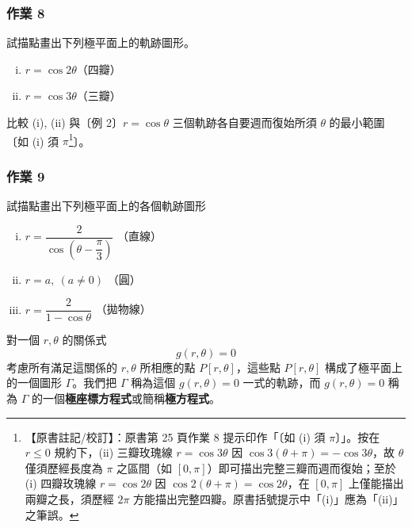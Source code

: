 \medskip
\subsubsection*{作業 8}
試描點畫出下列極平面上的軌跡圖形。
\begin{enumerate}[(i)]
  \item $r = \cos 2\theta$（四瓣）
  \item $r = \cos 3\theta$（三瓣）
\end{enumerate}
比較 (i), (ii) 與〔例 2〕$r = \cos\theta$ 三個軌跡各自要週而復始所須 $\theta$ 的最小範圍〔如 (i) 須 $\pi$\label{note:b5-ch1-p25-hw8}\footnote{【原書註記/校訂】：原書第 25 頁作業 8 提示印作「〔如 (i) 須 $\pi$〕」。按在 $r \le 0$ 規約下，(ii) 三瓣玫瑰線 $r = \cos 3\theta$ 因 $\cos 3(\theta + \pi) = -\cos 3\theta$，故 $\theta$ 僅須歷經長度為 $\pi$ 之區間（如 $[0, \pi]$）即可描出完整三瓣而週而復始；至於 (i) 四瓣玫瑰線 $r = \cos 2\theta$ 因 $\cos 2(\theta + \pi) = \cos 2\theta$，在 $[0, \pi]$ 上僅能描出兩瓣之長，須歷經 $2\pi$ 方能描出完整四瓣。原書括號提示中「(i)」應為「(ii)」之筆誤。}〕。

\medskip
\subsubsection*{作業 9}
試描點畫出下列極平面上的各個軌跡圖形
\begin{enumerate}[(i)]
  \item $r = \dfrac{2}{\cos\left(\theta - \dfrac{\pi}{3}\right)}$ \qquad （直線）
  \item $r = a, \ (a \neq 0)$ \qquad （圓）
  \item $r = \dfrac{2}{1 - \cos\theta}$ \qquad （拋物線）
\end{enumerate}

\medskip
\begin{definition*}
對一個 $r, \theta$ 的關係式
\begin{equation}\label{eq:b5-1-3-4}
  g(r, \theta) = 0 \tag{4}
\end{equation}
考慮所有滿足這關係的 $r, \theta$ 所相應的點 $P[r, \theta]$，這些點 $P[r, \theta]$ 構成了極平面上的一個圖形 $\Gamma$。我們把 $\Gamma$ 稱為這個 $g(r, \theta) = 0$ 一式的軌跡，而 $g(r, \theta) = 0$ 稱為 $\Gamma$ 的一個\textbf{極座標方程式}或簡稱\textbf{極方程式}。
\end{definition*}

\medskip
